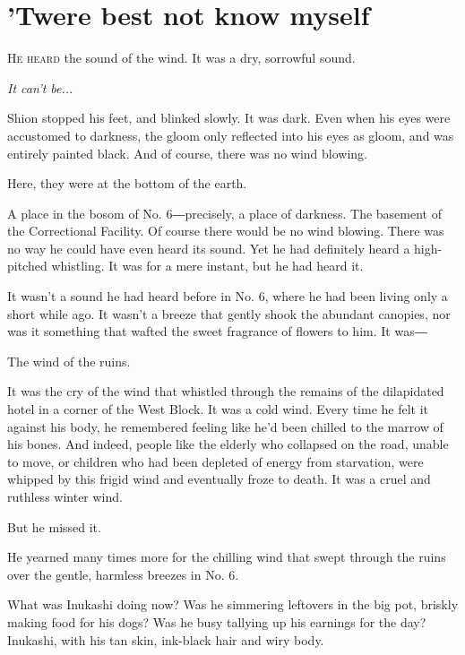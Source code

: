 
\chapter{'Twere best not know myself}


\lettrine{H}{e heard} the sound of the wind. It was a dry, sorrowful sound.

\emph{It can't be...}

Shion stopped his feet, and blinked slowly. It was dark. Even when his
eyes were accustomed to darkness, the gloom only reflected into his eyes
as gloom, and was entirely painted black. And of course, there was no
wind blowing.

Here, they were at the bottom of the earth.

A place in the bosom of No. 6―precisely, a place of darkness. The
basement of the Correctional Facility. Of course there would be no wind
blowing. There was no way he could have even heard its sound. Yet he had
definitely heard a high-pitched whistling. It was for a mere instant,
but he had heard it.

It wasn't a sound he had heard before in No. 6, where he had been living
only a short while ago. It wasn't a breeze that gently shook the
abundant canopies, nor was it something that wafted the sweet fragrance
of flowers to him. It was―

The wind of the ruins.

It was the cry of the wind that whistled through the remains of the
dilapidated hotel in a corner of the West Block. It was a cold wind.
Every time he felt it against his body, he remembered feeling like he'd
been chilled to the marrow of his bones. And indeed, people like the
elderly who collapsed on the road, unable to move, or children who had
been depleted of energy from starvation, were whipped by this frigid
wind and eventually froze to death. It was a cruel and ruthless winter
wind.

But he missed it.

He yearned many times more for the chilling wind that swept through the
ruins over the gentle, harmless breezes in No. 6.

What was Inukashi doing now? Was he simmering leftovers in the big pot,
briskly making food for his dogs? Was he busy tallying up his earnings
for the day? Inukashi, with his tan skin, ink-black hair and wiry body.

